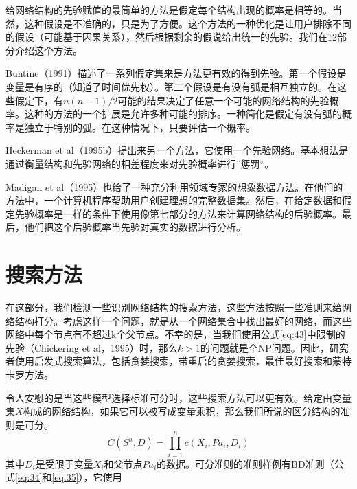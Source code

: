 \documentclass[10pt,a4paper]{article}
\begin{document}
\begin{CJK*}{UTF8}{gkai}
给网络结构的先验赋值的最简单的方法是假定每个结构出现的概率是相等的。当然，这种假设是不准确的，只是为了方便。这个方法的一种优化是让用户排除不同的假设（可能基于因果关系），然后根据剩余的假说给出统一的先验。我们在12部分介绍这个方法。


Buntine（1991）描述了一系列假定集来是方法更有效的得到先验。第一个假设是变量是有序的（知道了时间优先权）。第二个假设是有没有弧是相互独立的。在这些假定下，有$n(n-1)/2$可能的结果决定了任意一个可能的网络结构的先验概率。这种的方法的一个扩展是允许多种可能的排序。一种简化是假定有没有弧的概率是独立于特别的弧。在这种情况下，只要评估一个概率。


Heckerman et al（1995b）提出来另一个方法，它使用一个先验网络。基本想法是通过衡量结构和先验网络的相差程度来对先验概率进行”惩罚“。


Madigan et al（1995）也给了一种充分利用领域专家的想象数据方法。在他们的方法中，一个计算机程序帮助用户创建理想的完整数据集。然后，在给定数据和假定先验概率是一样的条件下使用像第七部分的方法来计算网络结构的后验概率。最后，他们把这个后验概率当先验对真实的数据进行分析。



\section{搜索方法}
在这部分，我们检测一些识别网络结构的搜索方法，这些方法按照一些准则来给网络结构打分。考虑这样一个问题，就是从一个网络集合中找出最好的网络，而这些网络中每个节点有不超过k个父节点。不幸的是，当我们使用公式\ref{eq:43}中限制的先验（Chickering et al，1995）时，那么$k>1$的问题就是个NP问题。因此，研究者使用启发式搜索算法，包括贪婪搜索，带重启的贪婪搜索，最佳最好搜索和蒙特卡罗方法。



令人安慰的是当这些模型选择标准可分时，这些搜索方法可以更有效。给定由变量集$X$构成的网络结构，如果它可以被写成变量乘积，那么我们所说的区分结构的准则是可分。
\begin{equation}
C(S^h,D)=\prod_{i=1}^n c(X_i,Pa_i,D_i)
\end{equation}
其中$D_i$是受限于变量$X_i$和父节点$Pa_i$的数据。可分准则的准则样例有BD准则（公式\ref{eq:34}和\ref{eq:35}），它使用







\end{CJK*}
\end{document}
